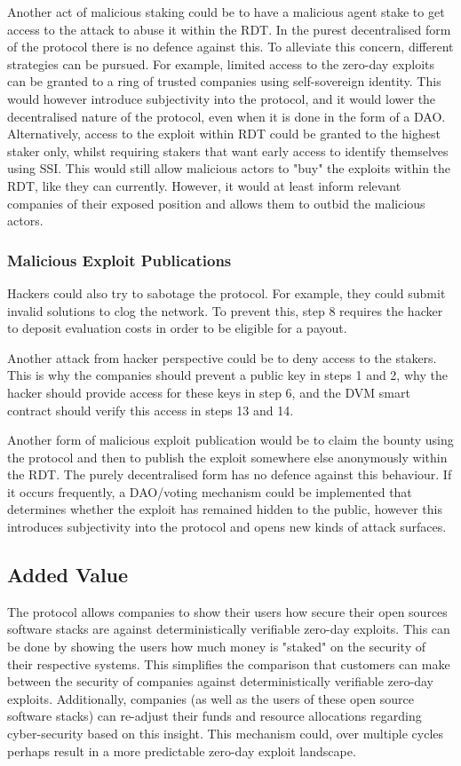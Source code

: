 Another act of malicious staking could be to have a malicious agent stake to get access to the attack to abuse it within the RDT. In the purest decentralised form of the protocol there is no defence against this.  To alleviate this concern, different strategies can be pursued. For example, limited access to the zero-day exploits can be granted to a ring of trusted companies using self-sovereign identity. This would however introduce subjectivity into the protocol, and it would lower the decentralised nature of the protocol, even when it is done in the form of a DAO. Alternatively, access to the exploit within RDT could be granted to the highest staker only, whilst requiring stakers that want early access to identify themselves using SSI. This would still allow malicious actors to "buy" the exploits within the RDT, like they can currently. However, it would at least inform relevant companies of their exposed position and allows them to outbid the malicious actors.
\subsubsection{Malicious Exploit Publications}
Hackers could also try to sabotage the protocol. For example, they could submit invalid solutions to clog the network. To prevent this, step 8 requires the hacker to deposit evaluation costs in order to be eligible for a payout.

Another attack from hacker perspective could be to deny access to the stakers. This is why the companies should prevent a public key in steps 1 and 2, why the hacker should provide access for these keys in step 6, and the DVM smart contract should verify this access in steps 13 and 14.

Another form of malicious exploit publication would be to claim the bounty using the protocol and then to publish the exploit somewhere else anonymously within the RDT. The purely decentralised form has no defence against this behaviour. If it occurs frequently, a DAO/voting mechanism could be implemented that determines whether the exploit has remained hidden to the public, however this introduces subjectivity into the protocol and opens new kinds of attack surfaces.

\subsection{Added Value}
The protocol allows companies to show their users how secure their open sources software stacks are against deterministically verifiable zero-day exploits. This can be done by showing the users how much money is "staked" on the security of their respective systems. This simplifies the comparison that customers can make between the security of companies against deterministically verifiable zero-day exploits. Additionally, companies (as well as the users of these open source software stacks) can re-adjust their funds and resource allocations regarding cyber-security based on this insight. This mechanism could, over multiple cycles perhaps result in a more predictable zero-day exploit landscape.